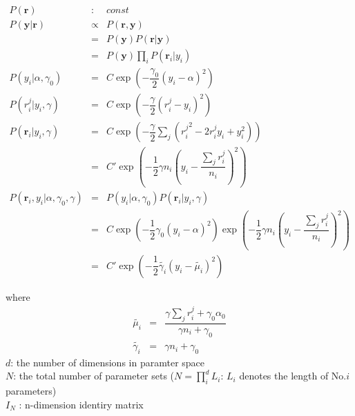 \documentclass[platex, a4paper]{jsarticle}
\begin{document}
\begin{eqnarray}
  P(\bm{r}) &:& const \\
  P\left( \bm{y} |\bm{r}\right) &\propto&  P\left( \bm{r} ,\bm{y}\right) \\
    &=& P\left( \bm{y} \right) P\left( \bm{r} |\bm{y}\right) \\
    &=& P\left( \bm{y} \right) \prod_i P\left( \bm{r}_i |y_i \right) \\
  P\left( y_{i} | \alpha, \gamma_0 \right) &=& C\exp \left( -\dfrac {\gamma_0} {2} \left( y_{i}-\alpha \right) ^{2}\right) \\
  P(r_{i}^{j} | y_{i}, \gamma) &=& C\exp \left( -\dfrac {\gamma} {2}\left( r_{i}^{j}-y_{i}\right) ^{2}\right) \\
  P\left( \bm{r}_i | y_i, \gamma \right) &=& C\exp \left( -\dfrac {\gamma} {2}\sum _{j}\left( {r_{i}^{j}}^2-2r_{i}^{j}y_{i}+y_{i}^{2}\right) \right) \\
    &=& C'\exp \left( -\dfrac {1} {2}\gamma n_{i}\left( y_{i}-\dfrac {\sum _{j}r_{i}^{j}} {n_{i}}\right) ^{2}\right) \\
  P\left( \bm{r}_i ,y_i | \alpha, \gamma_0, \gamma \right) &=& P\left( y_i | \alpha, \gamma_0 \right) P\left( \bm{r}_i | y_i, \gamma \right) \\
    &=& C\exp \left( -\dfrac {1} {2} \gamma_0 \left( y_{i}-\alpha \right) ^{2}\right)
    \exp \left( -\dfrac {1} {2}\gamma n_{i}\left( y_{i}-\dfrac {\sum _{j}r_{i}^{j}} {n_{i}}\right) ^{2}\right) \\
    &=& C'\exp \left( - \dfrac {1} {2} \tilde{\gamma_i} \left( y_{i} - \tilde {\mu_i} \right) ^{2}  \right)
\end{eqnarray}

where
\begin{eqnarray}
  \tilde{\mu_i} &=& \dfrac {\gamma \sum _{j}r_{i}^{j}+\gamma_0\alpha _{0}} {\gamma n_{i}+\gamma _{0}} \\
  \tilde{\gamma_i} &=& \gamma n_{i}+\gamma _{0}
\end{eqnarray}
$d$: the number of dimensions in paramter space \\
$N$: the total number of parameter sets ($N=\prod_i^d L_i$: $L_i$ denotes the length of No.$i$ parameters) \\
$I_{N}$ : n-dimension identiry matrix
\end{document}
